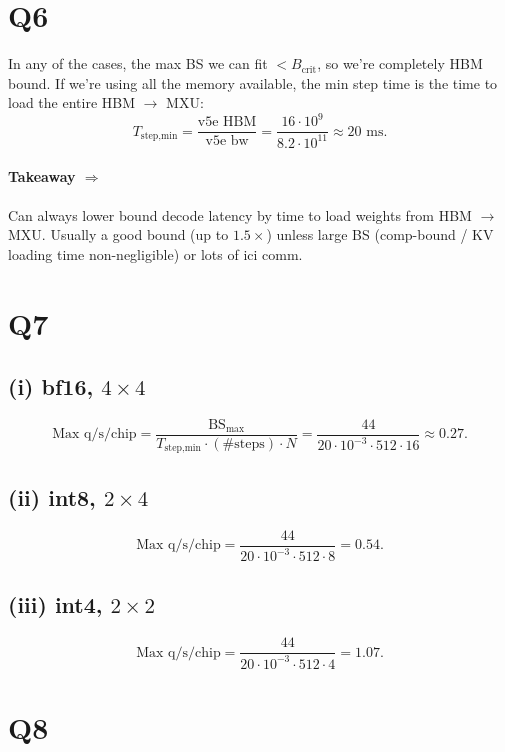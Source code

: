 \documentclass[11pt]{article}
\newcommand{\Tstepmin}{T_{\text{step,min}}}
\begin{document}
\section*{Q6}

In any of the cases, the max BS we can fit $< B_{\text{crit}}$, so we're completely HBM bound. If we're using all the memory available, the min step time is the time to load the entire HBM $\to$ MXU:
\[
\Tstepmin = \frac{\text{v5e HBM}}{\text{v5e bw}} = \frac{16 \cdot 10^9}{8.2 \cdot 10^{11}} \approx 20 \text{ ms.}
\]

\paragraph{Takeaway $\Rightarrow$} Can always lower bound decode latency by time to load weights from HBM $\to$ MXU. Usually a good bound (up to $1.5\times$) unless large BS (comp-bound / KV loading time non-negligible) or lots of ici comm.

\section*{Q7}

\subsection*{(i) bf16, $4 \times 4$}

\[
\text{Max q/s/chip} = \frac{\text{BS}_{\max}}{\Tstepmin \cdot (\text{\# steps}) \cdot N} = \frac{44}{20 \cdot 10^{-3} \cdot 512 \cdot 16} \approx 0.27.
\]

\subsection*{(ii) int8, $2 \times 4$}

\[
\text{Max q/s/chip} = \frac{44}{20 \cdot 10^{-3} \cdot 512 \cdot 8} = 0.54.
\]

\subsection*{(iii) int4, $2 \times 2$}

\[
\text{Max q/s/chip} = \frac{44}{20 \cdot 10^{-3} \cdot 512 \cdot 4} = 1.07.
\]

\section*{Q8}
\end{document}
